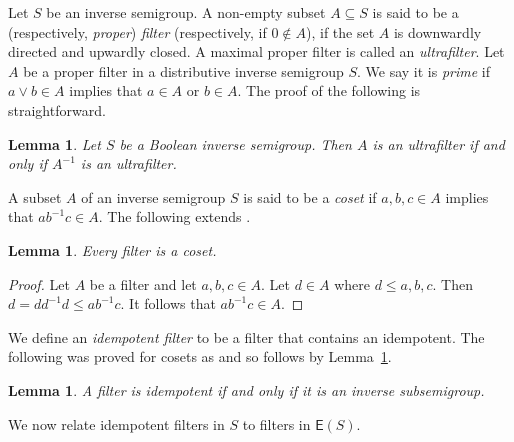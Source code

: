 \documentclass[a4paper]{amsart}
\newtheorem{lemma}[theorem]{Lemma}
\begin{document}
Let $S$ be an inverse semigroup.
A non-empty subset $A \subseteq S$ is said to be a (respectively, {\em proper}) {\em filter} 
(respectively, if $0 \notin A$),
if the set $A$ is downwardly directed and upwardly closed.
A maximal proper filter is called an {\em ultrafilter}.
Let $A$ be a proper filter in a distributive inverse semigroup $S$.
We say it is {\em prime} if $a \vee b \in A$ implies that $a \in A$ or $b \in A$.
The proof of the following is straightforward.

\begin{lemma}\label{lem:minuses} Let $S$ be a Boolean inverse semigroup.
Then $A$ is an ultrafilter if and only if  $A^{-1}$ is an ultrafilter.
\end{lemma}

A subset $A$ of an inverse semigroup $S$ is said to be a {\em coset} if $a,b,c \in A$ implies that $ab^{-1}c \in A$.
The following extends \cite[Lemma~2.6]{Lawson3}.

\begin{lemma}\label{lem:coset} 
Every filter is a coset.
\end{lemma}
\begin{proof} Let $A$ be a filter and let $a,b,c \in A$.
Let $d \in A$ where $d \leq a,b,c$.
Then $d = dd^{-1}d \leq ab^{-1}c$.
It follows that $ab^{-1}c \in A$.
\end{proof}

We define an {\em idempotent filter} to be a filter that contains an idempotent.
The following was proved for cosets as \cite[Proposition 1.5]{Lawson1996} and so follows by Lemma~\ref{lem:coset}.

\begin{lemma}\label{lem:idempotent-filter-is} 
A filter is idempotent if and only if it is an inverse subsemigroup.
\end{lemma}

We now relate idempotent filters in $S$ to filters in $\mathsf{E}(S)$.
\end{document}
